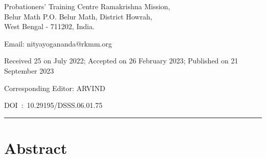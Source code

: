\documentclass[twoside, 13pt]{article}
\begin{document}
\maketitle
 \chead[]{}{}


\noindent



\vspace{-.5cm}

Probationers’ Training Centre Ramakrishna Mission,\\ Belur Math P.O. Belur Math, District Howrah,\\ West Bengal - 711202, India.

Email: nityayogananda@rkmm.org 


\vspace{.3cm}

Received 25 on July 2022; Accepted on 26 February 2023; Published on 21 September 2023

\vspace{.3cm}

Corresponding Editor: ARVIND

\vspace{.3cm}

DOI~:~10.29195/DSSS.06.01.75





  

\noindent\rule{\textwidth}{0.2mm}


\vspace{-.7cm}


{\fontsize{18}{20}\selectfont\section*{Abstract}}

\vspace{-.2cm}
\end{document}
